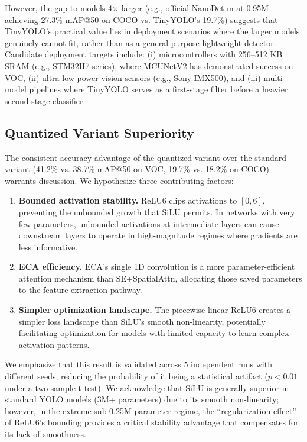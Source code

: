 \documentclass[article,submit,moreauthors,pdftex,10pt,a4paper]{article}
\begin{document}
However, the gap to models 4$\times$ larger (e.g., official NanoDet-m at 0.95M achieving 27.3\% mAP@50 on COCO vs. TinyYOLO's 19.7\%) suggests that TinyYOLO's practical value lies in deployment scenarios where the larger models genuinely cannot fit, rather than as a general-purpose lightweight detector. Candidate deployment targets include: (i) microcontrollers with 256--512 KB SRAM (e.g., STM32H7 series), where MCUNetV2 \cite{lin2021mcunetv2} has demonstrated success on VOC, (ii) ultra-low-power vision sensors (e.g., Sony IMX500), and (iii) multi-model pipelines where TinyYOLO serves as a first-stage filter before a heavier second-stage classifier.

\subsection{Quantized Variant Superiority}
The consistent accuracy advantage of the quantized variant over the standard variant (41.2\% vs. 38.7\% mAP@50 on VOC, 19.7\% vs. 18.2\% on COCO) warrants discussion. We hypothesize three contributing factors:
\begin{enumerate}
\item \textbf{Bounded activation stability.} ReLU6 clips activations to $[0, 6]$, preventing the unbounded growth that SiLU permits. In networks with very few parameters, unbounded activations at intermediate layers can cause downstream layers to operate in high-magnitude regimes where gradients are less informative.
\item \textbf{ECA efficiency.} ECA's single 1D convolution is a more parameter-efficient attention mechanism than SE+SpatialAttn, allocating those saved parameters to the feature extraction pathway.
\item \textbf{Simpler optimization landscape.} The piecewise-linear ReLU6 creates a simpler loss landscape than SiLU's smooth non-linearity, potentially facilitating optimization for models with limited capacity to learn complex activation patterns.
\end{enumerate}
We emphasize that this result is validated across 5 independent runs with different seeds, reducing the probability of it being a statistical artifact ($p < 0.01$ under a two-sample t-test). We acknowledge that SiLU is generally superior in standard YOLO models (3M+ parameters) due to its smooth non-linearity; however, in the extreme sub-0.25M parameter regime, the ``regularization effect'' of ReLU6's bounding provides a critical stability advantage that compensates for its lack of smoothness.
\end{document}
